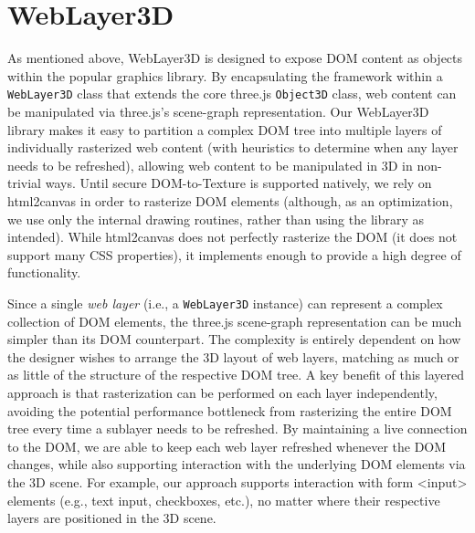 \documentclass[sigconf]{acmart}
\begin{document}
\section{WebLayer3D}
As mentioned above, WebLayer3D is designed to expose DOM content as objects within the popular  graphics library. By encapsulating the framework within a \verb|WebLayer3D| class that extends the core three.js \verb|Object3D| class, web content can be manipulated via three.js's scene-graph representation. Our WebLayer3D library makes it easy to partition a complex DOM tree into multiple layers of individually rasterized web content (with heuristics to determine when any layer needs to be refreshed), allowing web content to be manipulated in 3D in non-trivial ways. Until secure DOM-to-Texture is supported natively, we rely on html2canvas in order to rasterize DOM elements (although, as an optimization, we use only the internal drawing routines, rather than using the library as intended). While html2canvas does not perfectly rasterize the DOM (it does not support many CSS properties), it implements enough to provide a high degree of functionality.

Since a single \textit{web layer} (i.e., a \verb|WebLayer3D| instance) can represent a complex collection of DOM elements, the three.js scene-graph representation can be much simpler than its DOM counterpart. The complexity is entirely dependent on how the designer wishes to arrange the 3D layout of web layers, matching as much or as little of the structure of the respective DOM tree.  A key benefit of this layered approach is that rasterization can be performed on each layer independently, avoiding the potential performance bottleneck from rasterizing the entire DOM tree every time a sublayer needs to be refreshed. By maintaining a live connection to the DOM, we are able to keep each web layer refreshed whenever the DOM changes, while also supporting interaction with the underlying DOM elements via the 3D scene. For example, our approach supports interaction with form <input> elements (e.g., text input, checkboxes, etc.), no matter where their respective layers are positioned in the 3D scene. 
\end{document}
